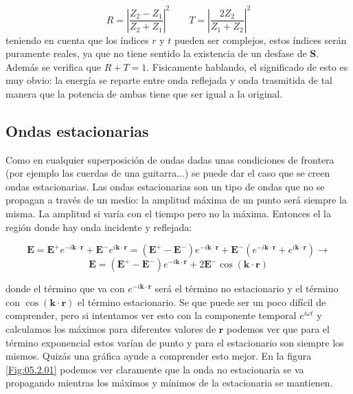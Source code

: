 \documentclass[12pt,a4paper]{article}
\newcommand{\En}{\mathbf{E}}
\newcommand{\kn}{\mathbf{k}}
\newcommand{\rn}{\mathbf{r}}
\newcommand{\Sn}{\mathbf{S}}
\numberwithin{equation}{section}
\numberwithin{figure}{section}
\begin{document}
\begin{equation}
R = \left| \dfrac{Z_2 - Z_1}{Z_2 + Z_1}  \right|^2 \quad \quad T= \left| \dfrac{2Z_2}{Z_1 + Z_2} \right|^2
\end{equation}
teniendo en cuenta que los índices $r$ y $t$ pueden ser complejos, estos índices serán puramente reales, ya que no tiene sentido la existencia de un desfase de $\Sn$. Además se verifica que $R+T=1$. Fisicamente hablando, el significado de esto es muy obvio: la energía se reparte entre onda reflejada y onda trasmitida de tal manera que la potencia de ambas tiene que ser igual a la original. 

\subsection{Ondas estacionarias}

Como en cualquier superposición de ondas dadas unas condiciones de frontera (por ejemplo las cuerdas de una guitarra...) se puede dar el caso que se creen ondas estacionarias. Las ondas estacionarias son un tipo de ondas que no se propagan a través de un medio: la amplitud máxima de un punto será siempre la misma. La amplitud si varía con el tiempo pero no la máxima. Entonces el la región donde hay onda incidente y reflejada:
 
 
$$\En = \En^+ e^{-i \kn \cdot \rn}+ \En^-e^{i \kn \cdot \rn}  =  (\En^+ - \En^-) e^{-i \kn \cdot \rn} + \En^- (e^{-i \kn \cdot \rn} + e^{i \kn \cdot \rn}) \longrightarrow $$
\begin{equation}
\En =  (\En^+ - \En^-) e^{-i \kn \cdot \rn} + 2 \En^- \cos (\kn \cdot \rn)
\end{equation}

donde el término que va con $e^{-i \kn \cdot \rn}$ será el término no estacionario y el término con $\cos (\kn \cdot \rn)$ el término estacionario. Se que puede ser un poco difícil de comprender, pero si intentamos ver esto con la componente temporal $e^{i \omega t}$ y calculamos los máximos para diferentes valores de $\rn$ podemos ver que para el término exponencial estos varían de punto y para el estacionario son siempre los mismos. Quizás una gráfica ayude a comprender esto mejor. En la figura \ref{Fig:05.2.01} podemos ver claramente que la onda no estacionaria se va propagando mientras los máximos y mínimos de la estacionaria se mantienen. 
\end{document}
